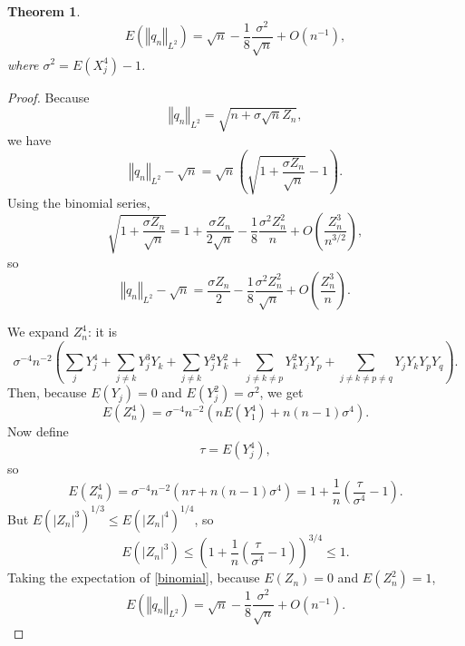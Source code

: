 \documentclass{article}
\newcommand{\norm}[1]{\left\Vert #1 \right\Vert}
\newtheorem{theorem}{Theorem}
\begin{document}
\begin{theorem}
\[
E(\norm{q_n}_{L^2}) = \sqrt{n} - \frac{1}{8} \frac{\sigma^2}{\sqrt{n}} + O(n^{-1}),
\]
where $\sigma^2 = E(X_j^4) - 1$.
\end{theorem}
\begin{proof}
Because 
\[
\norm{q_n}_{L^2} = \sqrt{n+\sigma \sqrt{n} Z_n},
\]
we have
\[
\norm{q_n}_{L^2} - \sqrt{n} = \sqrt{n} \left(\sqrt{ 1+\frac{\sigma Z_n}{\sqrt{n}}} - 1 \right).
\]
Using the binomial series,
\[
\sqrt{ 1+\frac{\sigma Z_n}{\sqrt{n}}} =
1+\frac{\sigma Z_n}{2\sqrt{n}} - \frac{1}{8} \frac{\sigma^2 Z_n^2}{n} + O\left(\frac{Z_n^3}{n^{3/2}}\right),
\]
so 
\begin{equation}
\norm{q_n}_{L^2} - \sqrt{n}  = \frac{\sigma Z_n}{2} - \frac{1}{8} \frac{\sigma^2 Z_n^2}{\sqrt{n}} + O \left( \frac{Z_n^3}{n}\right).
\label{binomial}
\end{equation}

We expand $Z_n^4$: it is
\[
\sigma^{-4} n^{-2} \left( \sum_j Y_j^4 + \sum_{j \neq k} Y_j^3 Y_k + \sum_{j \neq k} Y_j^2 Y_k^2
+ \sum_{j \neq k \neq p} Y_k^2 Y_j Y_p
+\sum_{j \neq k \neq p \neq q} Y_jY_kY_pY_q\right). 
\]
Then, because $E(Y_j)=0$ and $E(Y_j^2)=\sigma^2$, we get
\[
E(Z_n^4) = \sigma^{-4} n^{-2} ( nE(Y_1^4) + n(n-1)\sigma^4 ).
\]
Now define
\[
\tau = E(Y_j^4),
\]
so
\[
E(Z_n^4) = \sigma^{-4} n^{-2}(n\tau + n(n-1)\sigma^4)
=1+\frac{1}{n} \left( \frac{\tau}{\sigma^4} -1\right).
\]
But $E(|Z_n|^3)^{1/3} \leq E(|Z_n|^4)^{1/4}$, so
\[
E(|Z_n|^3) \leq \left(1+\frac{1}{n}\left(\frac{\tau}{\sigma^4}-1\right)\right)^{3/4} \leq 1.
\]
Taking the expectation of \eqref{binomial}, because $E(Z_n)=0$ and $E(Z_n^2)=1$,
\[
E(\norm{q_n}_{L^2}) = \sqrt{n} - \frac{1}{8} \frac{\sigma^2}{\sqrt{n}} + O(n^{-1}).
\]
\end{proof}
\end{document}

